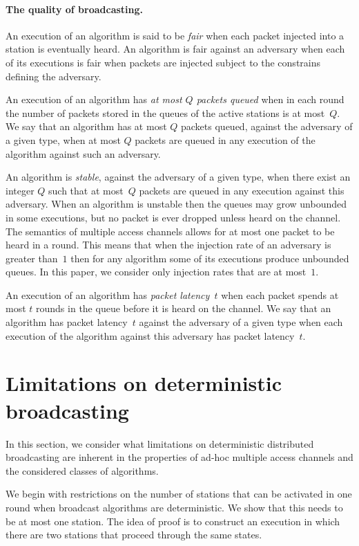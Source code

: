 \documentclass[11pt]{article}
\newcommand{\BBB}{\vspace*{-\bigskipamount}}
\newcommand{\Paragraph}[1]{\BBB\paragraph{#1}}
\begin{document}
\Paragraph{The quality of broadcasting.}




An execution of an algorithm is said to be \emph{fair} when each packet injected into a station is eventually heard.
An algorithm is fair against an adversary when each of its executions is fair when packets are injected subject to the constrains defining the adversary.

An execution of an algorithm has \emph{at most $Q$ packets queued} when in each round the number of packets stored in the queues of the active stations is at most~$Q$.
We say that an algorithm has at most $Q$ packets queued, against the adversary of a given type, when at most $Q$ packets are queued in any execution of the algorithm against such an adversary.

An algorithm is \emph{stable}, against the adversary of a given type, when there exist an integer $Q$ such that at most~$Q$ packets are queued in any execution against this adversary.
When an algorithm is unstable then the queues may grow unbounded in some executions, but no packet is ever dropped unless heard on the channel.
The semantics of multiple access channels allows for at most one packet to be heard in a round.
This means that when the injection rate of an adversary is greater than~$1$ then for any algorithm some of its executions produce unbounded queues.
In this paper, we consider only injection rates that are at most~$1$.

An execution of an algorithm has \emph{packet latency~$t$} when each packet spends at most $t$ rounds in the queue before it is heard on the channel.
We say that an algorithm has packet latency~$t$ against the adversary of a given type when each execution of the algorithm against this adversary  has packet latency~$t$.




\section{Limitations on deterministic broadcasting}

\label{sec:limitations}




In this section, we consider what limitations on deterministic distributed broadcasting are inherent in the properties of ad-hoc multiple access channels and the considered classes of algorithms.

We begin with restrictions on the number of stations that can be activated in one round when broadcast algorithms are deterministic.
We show that this needs to be at most one station.
The idea of proof is to construct an execution in which there are two stations that proceed through the same states.
\end{document}

